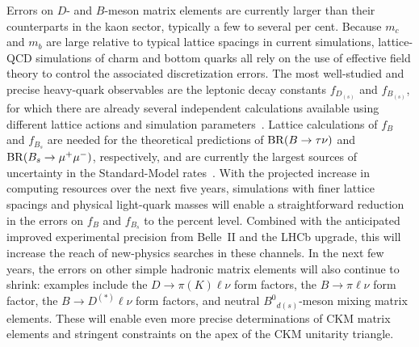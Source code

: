\begin{itemize}
Errors on $D$- and $B$-meson matrix elements are currently larger than their counterparts in the kaon sector, typically a few to several per cent.  Because $m_c$ and $m_b$ are large relative to typical lattice spacings in current simulations, lattice-QCD simulations of charm and bottom quarks all rely on the use of effective field theory to control the associated discretization errors.  The most well-studied and precise heavy-quark observables are the leptonic decay constants $f_{D_{(s)}}$ and $f_{B_{(s)}}$, for which there are already several independent calculations available using different lattice actions and simulation parameters~\cite{Namekawa:2011wt,Dimopoulos:2011gx,Bazavov:2011aa,Na:2012kp,Na:2012iu,Bernardoni:2012ti,Bazavov:2012dg,Carrasco:2012de,Dowdall:2013tga}.  Lattice calculations of $f_B$ and $f_{B_s}$ are needed for the theoretical predictions of ${\rm BR}(B \to \tau \nu)$ and ${\rm BR}(B_s \to \mu^+ \mu^-)$, respectively, and are currently the largest sources of uncertainty in the Standard-Model rates~\cite{Buras:2012ru}.   With the projected increase in computing resources over the next five years, simulations with finer lattice spacings and physical light-quark masses will enable a straightforward reduction in the errors on $f_B$ and $f_{B_s}$ to the percent level.  Combined with the anticipated improved experimental precision from Belle~II and the LHCb upgrade, this will increase the reach of new-physics searches in these channels.   In the next few years, the errors on other simple hadronic matrix elements will also continue to shrink: examples include the $D \to \pi(K) \ell \nu$ form factors, the $B \to \pi \ell \nu$ form factor, the $B\to D^{(*)}\ell\nu$ form factors, and neutral ${B^0}_{d(s)}$-meson mixing matrix elements.  These will enable even more precise determinations of CKM matrix elements and stringent constraints on the apex of the CKM unitarity triangle.


\end{itemize}
